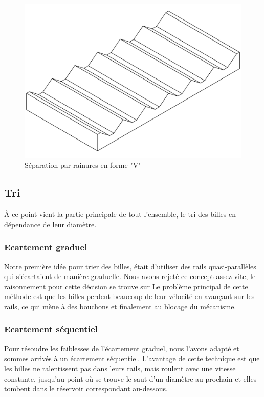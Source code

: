 \begin{figure}
    \centering
    \includegraphics[width=\textwidth]{Graphics/Rails/SEPARATEUR_V.pdf}
    \caption{Séparation par rainures en forme "V"}
\end{figure}

\subsection{Tri}
À ce point vient la partie principale de tout l'ensemble, le tri des billes en dépendance de leur diamètre.

\subsubsection{Ecartement graduel}
Notre première idée pour trier des billes, était d'utiliser des rails quasi-parallèles qui s'écartaient de manière graduelle. Nous avons rejeté ce concept assez vite, le raisonnement pour cette décision se trouve sur %
Le problème principal de cette méthode est que les billes perdent beaucoup de leur vélocité en avançant sur les rails, ce qui mène à des bouchons et finalement au blocage du mécanisme.

\subsubsection{Ecartement séquentiel}
Pour résoudre les faiblesses de l'écartement graduel, nous l'avons adapté et sommes arrivés à un écartement séquentiel. L'avantage de cette technique est que les billes ne ralentissent pas dans leurs rails, mais roulent avec une vitesse constante, jusqu'au point où se trouve le saut d'un diamètre au prochain et elles tombent dans le réservoir correspondant au-dessous.

